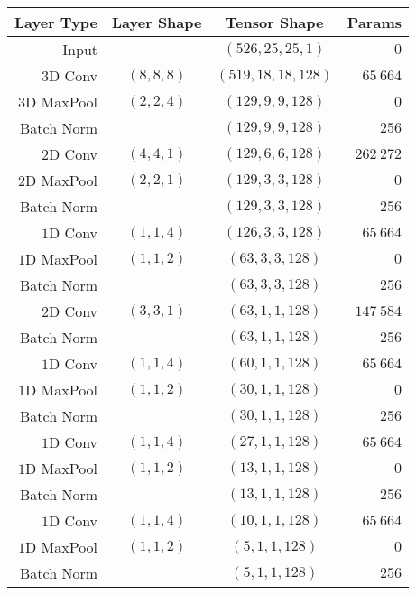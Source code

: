 \documentclass[fleqn,usenatbib]{mnras}
\begin{document}
\bsp
\newpage
\begin{table}
\centering
\begin{tabular}{r|c|c|r} 
    Layer Type & Layer Shape & Tensor Shape & Params \\ 
    \hline\hline
Input &  & $(526, 25, 25, 1)$ & $0$         \\
\hline
$3\mathrm{D}$ Conv & $(8, 8, 8)$ & $(519, 18, 18, 128)$ &  $65~664$      \\
\hline
$3\mathrm{D}$ MaxPool  & $(2, 2, 4)$ & $(129, 9, 9, 128)$  &   $0$         \\
\hline
Batch Norm & & $(129, 9, 9, 128)$ &     $256$       \\
\hline
$2\mathrm{D}$ Conv & $(4, 4, 1)$ & $(129, 6, 6, 128)$ &  $262~272$      \\
\hline
$2\mathrm{D}$ MaxPool  & $(2, 2, 1)$ & $(129, 3, 3, 128)$  &   $0$         \\
\hline
Batch Norm & & $(129, 3, 3, 128)$ &     $256$       \\
\hline
$1\mathrm{D}$ Conv & $(1, 1, 4)$ & $(126, 3, 3, 128)$ &  $65~664$      \\
\hline
$1\mathrm{D}$ MaxPool  & $(1, 1, 2)$ & $(63, 3, 3, 128)$  &   $0$         \\
\hline
Batch Norm & & $(63, 3, 3, 128)$ &     $256$       \\
\hline
$2\mathrm{D}$ Conv & $(3, 3, 1)$ & $(63, 1, 1, 128)$ &  $147~584$      \\
\hline
Batch Norm & & $(63, 1, 1, 128)$ &     $256$       \\
\hline
$1\mathrm{D}$ Conv & $(1, 1, 4)$ & $(60, 1, 1, 128)$ &  $65~664$      \\
\hline
$1\mathrm{D}$ MaxPool  & $(1, 1, 2)$ & $(30, 1, 1, 128)$  &   $0$         \\
\hline
Batch Norm & & $(30, 1, 1, 128)$ &     $256$       \\
\hline
$1\mathrm{D}$ Conv & $(1, 1, 4)$ & $(27, 1, 1, 128)$ &  $65~664$      \\
\hline
$1\mathrm{D}$ MaxPool  & $(1, 1, 2)$ & $(13, 1, 1, 128)$  &   $0$         \\
\hline
Batch Norm & & $(13, 1, 1, 128)$ &     $256$       \\
\hline
$1\mathrm{D}$ Conv & $(1, 1, 4)$ & $(10, 1, 1, 128)$ &  $65~664$      \\
\hline
$1\mathrm{D}$ MaxPool  & $(1, 1, 2)$ & $(5, 1, 1, 128)$  &   $0$         \\
\hline
Batch Norm & & $(5, 1, 1, 128)$ &     $256$       \\

\end{tabular}
\end{table}
\end{document}
